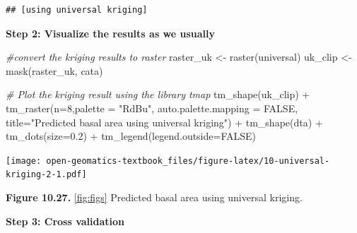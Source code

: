 \documentclass[
]{book}
\newenvironment{Shaded}{\begin{snugshade}}{\end{snugshade}}
\newcommand{\AttributeTok}[1]{\textcolor[rgb]{0.77,0.63,0.00}{#1}}
\newcommand{\CommentTok}[1]{\textcolor[rgb]{0.56,0.35,0.01}{\textit{#1}}}
\newcommand{\ConstantTok}[1]{\textcolor[rgb]{0.00,0.00,0.00}{#1}}
\newcommand{\DecValTok}[1]{\textcolor[rgb]{0.00,0.00,0.81}{#1}}
\newcommand{\DocumentationTok}[1]{\textcolor[rgb]{0.56,0.35,0.01}{\textbf{\textit{#1}}}}
\newcommand{\FloatTok}[1]{\textcolor[rgb]{0.00,0.00,0.81}{#1}}
\newcommand{\FunctionTok}[1]{\textcolor[rgb]{0.00,0.00,0.00}{#1}}
\newcommand{\NormalTok}[1]{#1}
\newcommand{\OtherTok}[1]{\textcolor[rgb]{0.56,0.35,0.01}{#1}}
\newcommand{\SpecialCharTok}[1]{\textcolor[rgb]{0.00,0.00,0.00}{#1}}
\newcommand{\StringTok}[1]{\textcolor[rgb]{0.31,0.60,0.02}{#1}}
\begin{document}
\begin{verbatim}
## [using universal kriging]
\end{verbatim}

\textbf{Step 2: Visualize the results as we usually}

\begin{Shaded}
\begin{Highlighting}[]
\CommentTok{\#convert the kriging results to raster}
\NormalTok{raster\_uk      }\OtherTok{\textless{}{-}} \FunctionTok{raster}\NormalTok{(universal)}
\NormalTok{uk\_clip    }\OtherTok{\textless{}{-}} \FunctionTok{mask}\NormalTok{(raster\_uk, cata)}

\CommentTok{\# Plot the kriging result using the library tmap}
\FunctionTok{tm\_shape}\NormalTok{(uk\_clip) }\SpecialCharTok{+} 
  \FunctionTok{tm\_raster}\NormalTok{(}\AttributeTok{n=}\DecValTok{8}\NormalTok{,}\AttributeTok{palette =} \StringTok{"RdBu"}\NormalTok{, }\AttributeTok{auto.palette.mapping =} \ConstantTok{FALSE}\NormalTok{,}
            \AttributeTok{title=}\StringTok{"Predicted basal area using universal kriging"}\NormalTok{) }\SpecialCharTok{+} 
  \FunctionTok{tm\_shape}\NormalTok{(dta) }\SpecialCharTok{+} \FunctionTok{tm\_dots}\NormalTok{(}\AttributeTok{size=}\FloatTok{0.2}\NormalTok{) }\SpecialCharTok{+}
  \FunctionTok{tm\_legend}\NormalTok{(}\AttributeTok{legend.outside=}\ConstantTok{FALSE}\NormalTok{)}
\end{Highlighting}
\end{Shaded}

\texttt{[image: open-geomatics-textbook\_files/figure-latex/10-universal-kriging-2-1.pdf]}

\textbf{Figure 10.27.} \ref{fig:figs} Predicted basal area using universal kriging.

\textbf{Step 3: Cross validation}

\begin{Shaded}
\end{Shaded}
\end{document}
